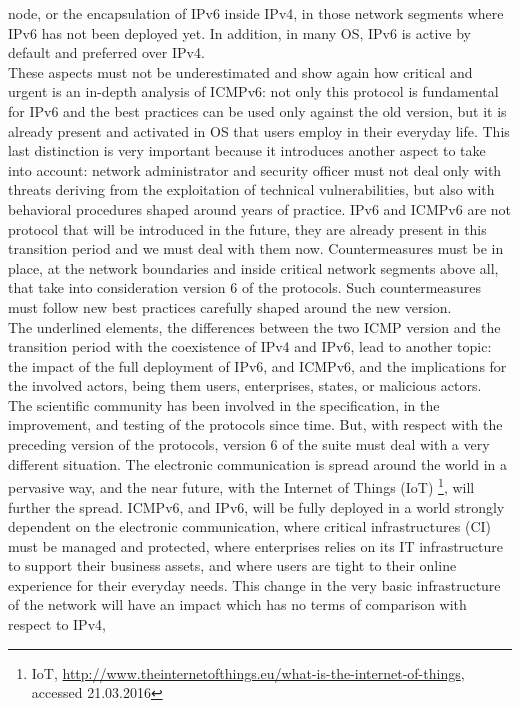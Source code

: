 \documentclass[12pt]{article}
\begin{document}
node, or the encapsulation of IPv6 inside IPv4, in those network segments where IPv6 has not been deployed yet. In addition, in many OS, IPv6 is active by default and preferred over IPv4.\\
These aspects must not be underestimated and show again how critical and urgent is an in-depth analysis of ICMPv6: not only this protocol is fundamental for IPv6 and the best practices can be used only against the old 
version, but it is already present and activated in OS that users employ in their everyday life. This last distinction is very important because it introduces another aspect to take into account: network 
administrator and security officer must not deal only with threats deriving from the exploitation of technical vulnerabilities, but also with behavioral procedures shaped around years of practice. IPv6 and ICMPv6 are 
not protocol that will be introduced in the future, they are already present in this transition period and we must deal with them now. Countermeasures must be in place, at the network boundaries and inside critical 
network segments above all, that take into consideration version 6 of the protocols. Such countermeasures must follow new best practices carefully shaped around the new version.\\
The underlined elements, the differences between the two ICMP version and the transition period with the coexistence of IPv4 and IPv6, lead to another topic: the impact of the full deployment of IPv6, and ICMPv6, and the 
implications for the involved actors, being them users, enterprises, states, or malicious actors.\\
The scientific community has been involved in the specification, in the improvement, and testing of the protocols since time. But, with respect with the preceding version of the protocols, version 6 of the suite 
must deal with a very different situation. The electronic communication is spread around the world in a pervasive way, and the near future, with the Internet of Things (IoT)
\footnote{IoT, \url{http://www.theinternetofthings.eu/what-is-the-internet-of-things}, accessed 21.03.2016}, will further the spread. ICMPv6, and IPv6, 
will be fully deployed in a world strongly dependent on the electronic communication, where critical infrastructures (CI) must be managed and protected, where enterprises relies on its IT infrastructure to support their business 
assets, and where users are tight to their online experience for their everyday needs. This change in the very basic infrastructure of the network will have an impact which has no terms of comparison with respect to IPv4, 
\end{document}
